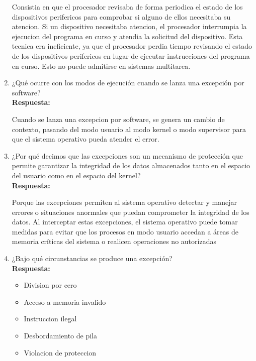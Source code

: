 \documentclass[a4paper,12pt]{article}
\begin{document}
\begin{enumerate}[label=\textbf{Pregunta \arabic*.}]
    Consistia en que el procesador revisaba de forma periodica el estado de los dispositivos perifericos para comprobar si alguno de ellos necesitaba su atencion. Si un dispositivo necesitaba atencion, el procesador interrumpia la ejecucion del programa en curso y atendia la solicitud del dispositivo. Esta tecnica era ineficiente, ya que el procesador perdia tiempo revisando el estado de los dispositivos perifericos en lugar de ejecutar instrucciones del programa en curso. Esto no puede admitirse en sistemas multitarea.
    

    \item ¿Qué ocurre con los modos de ejecución cuando se lanza una excepción por software? \\
    \textbf{Respuesta:} 
    
    Cuando se lanza una excepcion por software, se genera un cambio de contexto, pasando del modo usuario al modo kernel o modo supervisor para que el sistema operativo pueda atender el error. 




    \item ¿Por qué decimos que las excepciones son un mecanismo de protección que permite garantizar la integridad de los datos almacenados tanto en el espacio del usuario como en el espacio del kernel? \\
    \textbf{Respuesta:} 

    Porque las excepciones permiten al sistema operativo detectar y manejar errores o situaciones anormales que puedan comprometer la integridad de los datos. Al interceptar estas excepciones, el sistema operativo puede tomar medidas para evitar que los procesos en modo usuario accedan a áreas de memoria críticas del sistema o realicen operaciones no autorizadas
    

    \item ¿Bajo qué circunstancias se produce una excepción? \\
    \textbf{Respuesta:} 
    
    \begin{itemize}
        \item Division por cero
        \item Acceso a memoria invalido
        \item Instruccion ilegal
        \item Desbordamiento de pila
        \item Violacion de proteccion
    \end{itemize}

\end{enumerate}
\end{document}
